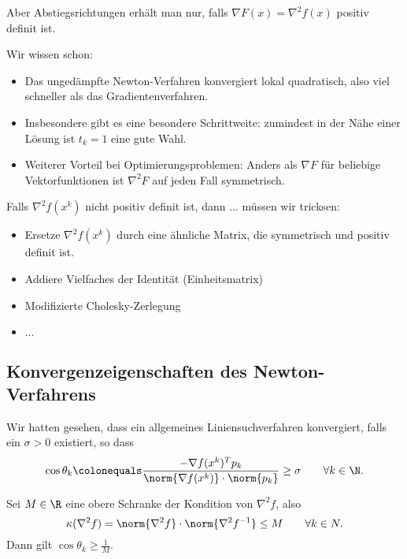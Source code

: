 \medskip

Aber Abstiegsrichtungen erhält man nur, falls $\nabla F(x)=\nabla^2 f(x)$ positiv definit ist.

\bigskip


Wir wissen schon:
\begin{itemize}
 \item Das ungedämpfte Newton-Verfahren konvergiert lokal quadratisch, also viel schneller als das Gradientenverfahren.
 \item Insbesondere gibt es eine besondere Schrittweite: zumindest in der Nähe einer Lösung ist $t_k=1$ eine gute Wahl.
 \item Weiterer Vorteil bei Optimierungsproblemen: Anders als $\nabla F$ für beliebige Vektorfunktionen ist $\nabla^2 F$ auf jeden Fall symmetrisch.
\end{itemize}

Falls $\nabla^2 f (x^k )$ nicht positiv definit ist, dann $\ldots$ müssen wir tricksen:
\begin{itemize}
 \item Ersetze $\nabla^2 f (x^k )$ durch eine ähnliche Matrix, die symmetrisch und positiv definit ist.
 \item Addiere Vielfaches der Identität (Einheitsmatrix)
 \item Modifizierte Cholesky-Zerlegung
 \item $\ldots$
\end{itemize}

\subsection{Konvergenzeigenschaften des Newton-Verfahrens}

Wir hatten gesehen, dass
ein allgemeines Liniensuchverfahren konvergiert, falls ein $\sigma > 0$ existiert, so dass
\begin{equation*}
 \cos \theta_k
 \colonequals
 \frac{-\nabla f (x^k )^Tp_k}{\norm{\nabla f(x^k)} \cdot \norm{p_k}} \ge \sigma
 \qquad
 \forall k \in \N.
\end{equation*}

\begin{lemma}[Übung]
Sei $M \in \R$ eine obere Schranke der Kondition von $\nabla^2f$, also
\begin{equation*}
 \kappa (\nabla^2f) = \norm{\nabla^2f} \cdot \norm{\nabla^2f^{-1}} \leq M
 \qquad
 \forall k \in N.
\end{equation*}
Dann gilt $\cos \theta_k \geq \frac{1}{M}$.
\end{lemma}

